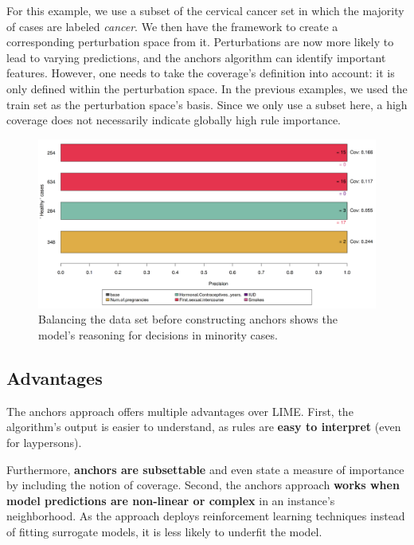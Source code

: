 \documentclass[12pt,]{krantz}
\begin{document}
For this example, we use a subset of the cervical cancer set in which
the majority of cases are labeled \emph{cancer}. We then have the
framework to create a corresponding perturbation space from it.
Perturbations are now more likely to lead to varying predictions, and
the anchors algorithm can identify important features. However, one
needs to take the coverage's definition into account: it is only defined
within the perturbation space. In the previous examples, we used the
train set as the perturbation space's basis. Since we only use a subset
here, a high coverage does not necessarily indicate globally high rule
importance.

\begin{figure}

{\centering \includegraphics[width=\textwidth]{images/unnamed-chunk-38-1} 

}

\caption{Balancing the data set before constructing anchors shows the model's reasoning for decisions in minority cases.}\label{fig:unnamed-chunk-38}
\end{figure}

\subsection{Advantages}\label{advantages-15}

The anchors approach offers multiple advantages over LIME. First, the
algorithm's output is easier to understand, as rules are \textbf{easy to
interpret} (even for laypersons).

Furthermore, \textbf{anchors are subsettable} and even state a measure
of importance by including the notion of coverage. Second, the anchors
approach \textbf{works when model predictions are non-linear or complex}
in an instance's neighborhood. As the approach deploys reinforcement
learning techniques instead of fitting surrogate models, it is less
likely to underfit the model.
\end{document}
